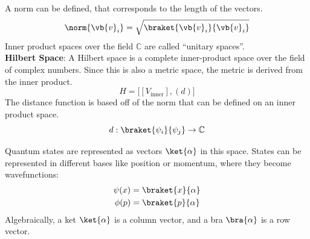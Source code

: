 A norm can be defined, that corresponds to the length of the vectors. 
\begin{equation*}
	\norm{\vb{v}_i}=\sqrt{\braket{\vb{v}_i}{\vb{v}_i}}
\end{equation*}
Inner product spaces over the field \(\mathbb{C}\) are called ``unitary spaces''.
\\
\textbf{Hilbert Space}: A Hilbert space is a complete inner-product space over the field of complex numbers. Since this is also a metric space, the metric is derived from the inner product.
\[H=\big[[V_{\text{inner}}],(d)\big]\]
The distance function is based off of the norm that can be defined on an inner product space.
\begin{equation*}
	d:\braket{\psi_i}{\psi_j}\rightarrow\mathbb{C}
\end{equation*}

Quantum states are represented as vectors \(\ket{\alpha}\) in this space. States can be represented in different bases like position or momentum, where they become wavefunctions:
\begin{align*}
	\psi(x)&=\braket{x}{\alpha}	
	\\
	\phi(p)&=\braket{p}{\alpha}
\end{align*}
Algebraically, a ket \(\ket{\alpha}\) is a column vector, and a bra \(\bra{\alpha}\) is a row vector. 
\newpage